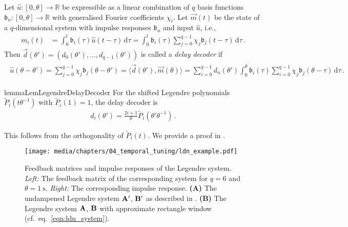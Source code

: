 \begin{definition}
\label{def:delay_decoder}
Let $\hat u : [0, \theta] \longrightarrow \mathbb{R}$ be expressible as a linear combination of $q$ basis functions $\mathfrak{b}_n : [0, \theta] \longrightarrow \mathbb{R}$ with generalised Fourier coefficients $\chi_i$.
Let $\vec m(t)$ be the state of a $q$-dimensional system with impulse responses $\mathfrak{b}_n$ and input $\hat u$, i.e.,
\begin{align*}
	m_i(t)
		&= \int_{0}^t \mathfrak{b}_i(\tau) \hat u(t - \tau) \,\mathrm{d}\tau
		 = \int_{0}^t \mathfrak{b}_i(\tau) \sum_{j = 0}^{q - 1} \chi_j \mathfrak{b}_j(t - \tau )\,\mathrm{d}\tau \,.
\end{align*}
Then $\vec d(\theta') = (d_0(\theta'), \ldots, d_{q - 1}(\theta'))$ is called a \emph{delay decoder} if
\begin{align}
	\begin{aligned}
	\hat u(\theta - \theta')
		 = \sum_{j = 0}^{q - 1} \chi_j \mathfrak{b}_j(\theta - \theta')
		 = \big\langle \vec d(\theta'), \vec m(\theta) \big\rangle
		 = \sum_{i = 0}^{q - 1} d_n(\theta') \int_{0}^\theta \mathfrak{b}_i(\tau) \sum_{i = 0}^{q - 1} \chi_j \mathfrak{b}_j(\theta - \tau )\,\mathrm{d}\tau \,.
	\end{aligned}
	\label{eqn:delay_decoder}
\end{align}
\end{definition}

\begin{restatable}{lemma}{LemLegendreDelayDecoder}%
	\label{lem:legendre_delay_decoder}%
	For the shifted Legendre polynomials $\tilde P_i(t \theta^{-1})$ with $\tilde P_i(1) = 1$, the delay decoder is
	\begin{align*}
		d_i(\theta') = \frac{2i + 1}{\theta} \tilde P_i(\theta' \theta^{-1}) \,.
	\end{align*}
\end{restatable}
\noindent This follows from the orthogonality of $\tilde P_i(t)$. We provide a proof in .

\begin{figure}
	\centering
	\texttt{[image: media/chapters/04\_temporal\_tuning/ldn\_example.pdf]}%
	{\label{fig:ldn_example_a}}%
	{\label{fig:ldn_example_b}}%
	\caption[Feedback matrices and impulse responses of the Legendre system]{Feedback matrices and impulse responses of the Legendre system.
	\emph{Left:} The feedback matrix of the corresponding system for $q = 6$ and $\theta = \SI{1}{\second}$. \emph{Right:} The corresponding impulse response.
	\textbf{(A)} The undampened Legendre system $\mathbf{A}'$, $\mathbf{B}'$ as described in .
	\textbf{(B)} The Legendre system $\mathbf{A}$, $\mathbf{B}$ with approximate rectangle window (cf.~eq.~\ref{eqn:ldn_system}).
	}
	\label{fig:ldn_example}
\end{figure}

